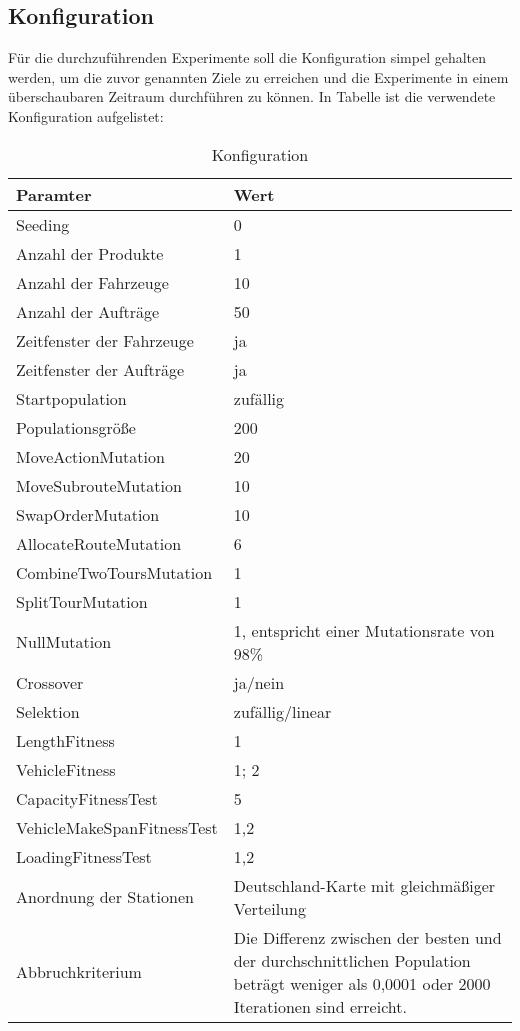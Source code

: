 \subsection{Konfiguration}
\label{sec:Konfiguration}
Für die durchzuführenden Experimente soll die Konfiguration simpel gehalten werden, um die zuvor genannten Ziele zu erreichen und die Experimente in einem überschaubaren Zeitraum durchführen zu können. In Tabelle  ist die verwendete Konfiguration aufgelistet:

\begin{table}[ht!]
 \caption{Konfiguration}
 \begin{tabular}{lp{10cm}}
 \toprule
 \textbf {Paramter} & \textbf{Wert} \\
 \toprule
 Seeding & 0 \\
 \midrule
 Anzahl der Produkte & 1 \\
 \midrule
 Anzahl der Fahrzeuge & 10 \\
 \midrule
 Anzahl der Aufträge & 50 \\
 \midrule
 Zeitfenster der Fahrzeuge & ja \\
 \midrule
 Zeitfenster der Aufträge & ja \\
 \midrule
 Startpopulation & zufällig \\
 \midrule
 Populationsgröße & 200 \\
 \midrule
 MoveActionMutation & 20 \\
 \midrule
 MoveSubrouteMutation & 10 \\
 \midrule
 SwapOrderMutation & 10 \\
 \midrule
 AllocateRouteMutation & 6 \\
 \midrule
 CombineTwoToursMutation & 1 \\
 \midrule
 SplitTourMutation & 1 \\
 \midrule
 NullMutation & 1, entspricht einer Mutationsrate von 98\% \\
 \midrule
 Crossover & ja/nein \\
 \midrule
 Selektion & zufällig/linear \\
 \midrule
 LengthFitness & 1 \\
 \midrule
 VehicleFitness & 1; 2 \\
 \midrule
 CapacityFitnessTest & 5 \\
 \midrule
 VehicleMakeSpanFitnessTest & 1,2 \\
 \midrule
 LoadingFitnessTest & 1,2 \\
 \midrule
 Anordnung der Stationen & Deutschland-Karte mit gleichmäßiger Verteilung \\
 \midrule
 Abbruchkriterium & Die Differenz zwischen der besten und der durchschnittlichen Population beträgt weniger als 0,0001 oder 2000 Iterationen sind erreicht. \\
 \bottomrule
 \end{tabular}
 \label{tab:Konfiguration}
\end{table}

